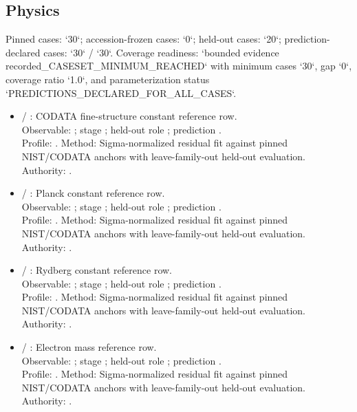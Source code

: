 \subsection{Physics}
Pinned cases: `30`; accession-frozen cases: `0`; held-out cases: `20`; prediction-declared cases: `30` / `30`.
Coverage readiness: `bounded evidence recorded\_CASESET\_MINIMUM\_REACHED` with minimum cases `30`, gap `0`, coverage ratio `1.0`, and parameterization status `PREDICTIONS\_DECLARED\_FOR\_ALL\_CASES`.
\begin{itemize}
\item {} / : CODATA fine-structure constant reference row.\\ Observable: ; stage ; held-out role ; prediction .\\ Profile: . Method: Sigma-normalized residual fit against pinned NIST/CODATA anchors with leave-family-out held-out evaluation. Authority: .
\item {} / : Planck constant reference row.\\ Observable: ; stage ; held-out role ; prediction .\\ Profile: . Method: Sigma-normalized residual fit against pinned NIST/CODATA anchors with leave-family-out held-out evaluation. Authority: .
\item {} / : Rydberg constant reference row.\\ Observable: ; stage ; held-out role ; prediction .\\ Profile: . Method: Sigma-normalized residual fit against pinned NIST/CODATA anchors with leave-family-out held-out evaluation. Authority: .
\item {} / : Electron mass reference row.\\ Observable: ; stage ; held-out role ; prediction .\\ Profile: . Method: Sigma-normalized residual fit against pinned NIST/CODATA anchors with leave-family-out held-out evaluation. Authority: .

\end{itemize}

